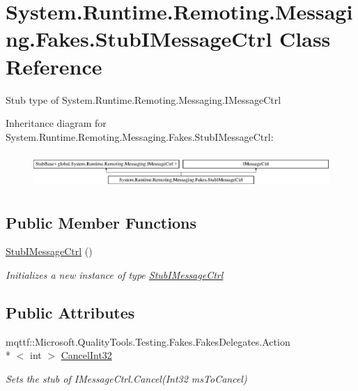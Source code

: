 \hypertarget{class_system_1_1_runtime_1_1_remoting_1_1_messaging_1_1_fakes_1_1_stub_i_message_ctrl}{\section{System.\-Runtime.\-Remoting.\-Messaging.\-Fakes.\-Stub\-I\-Message\-Ctrl Class Reference}
\label{class_system_1_1_runtime_1_1_remoting_1_1_messaging_1_1_fakes_1_1_stub_i_message_ctrl}
}


Stub type of System.\-Runtime.\-Remoting.\-Messaging.\-I\-Message\-Ctrl 


Inheritance diagram for System.\-Runtime.\-Remoting.\-Messaging.\-Fakes.\-Stub\-I\-Message\-Ctrl\-:\begin{figure}[H]
\begin{center}
\leavevmode
\includegraphics[height=1.330166cm]{class_system_1_1_runtime_1_1_remoting_1_1_messaging_1_1_fakes_1_1_stub_i_message_ctrl}
\end{center}
\end{figure}
\subsection*{Public Member Functions}
\begin{DoxyCompactItemize}
\item 
\hyperlink{class_system_1_1_runtime_1_1_remoting_1_1_messaging_1_1_fakes_1_1_stub_i_message_ctrl_ab7ee71d2a5843d2e0fc58a69e33f812e}{Stub\-I\-Message\-Ctrl} ()
\begin{DoxyCompactList}\small\item\em Initializes a new instance of type \hyperlink{class_system_1_1_runtime_1_1_remoting_1_1_messaging_1_1_fakes_1_1_stub_i_message_ctrl}{Stub\-I\-Message\-Ctrl}\end{DoxyCompactList}\end{DoxyCompactItemize}
\subsection*{Public Attributes}
\begin{DoxyCompactItemize}
\item 
mqttf\-::\-Microsoft.\-Quality\-Tools.\-Testing.\-Fakes.\-Fakes\-Delegates.\-Action\\*
$<$ int $>$ \hyperlink{class_system_1_1_runtime_1_1_remoting_1_1_messaging_1_1_fakes_1_1_stub_i_message_ctrl_a40dc7b48df15d289a3cd9319c0d7991c}{Cancel\-Int32}
\begin{DoxyCompactList}\small\item\em Sets the stub of I\-Message\-Ctrl.\-Cancel(\-Int32 ms\-To\-Cancel)\end{DoxyCompactList}\end{DoxyCompactItemize}


